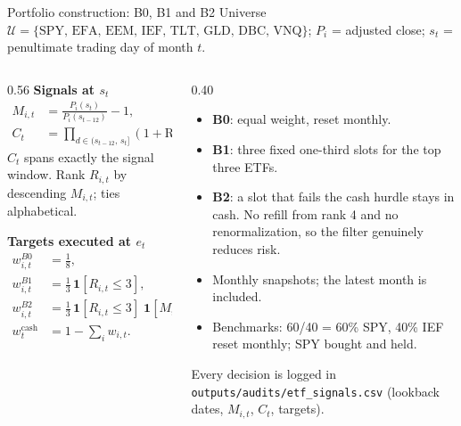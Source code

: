 \documentclass[aspectratio=169,11pt]{beamer}
\begin{document}
\begin{frame}[t]{Portfolio construction: B0, B1 and B2}
\small
Universe $\mathcal{U}=\{\text{SPY, EFA, EEM, IEF, TLT, GLD, DBC, VNQ}\}$; $P_i$ = adjusted close; $s_t$ = penultimate trading day of month $t$.
\vskip0.1cm
\begin{columns}[T,onlytextwidth]
\begin{column}{0.56\textwidth}
\textbf{Signals at $s_t$}
\begin{align*}
M_{i,t} &= \frac{P_i(s_t)}{P_i(s_{t-12})}-1, \\
C_t &= \prod_{d\in(s_{t-12},\,s_t]}(1+\mathrm{RF}_d)-1 .
\end{align*}
$C_t$ spans exactly the signal window. Rank $R_{i,t}$ by descending $M_{i,t}$; ties alphabetical.

\vskip0.15cm
\textbf{Targets executed at $e_t$}
\begin{align*}
w^{B0}_{i,t} &= \tfrac18, \\
w^{B1}_{i,t} &= \tfrac13\,\mathbf{1}[R_{i,t}\le 3], \\
w^{B2}_{i,t} &= \tfrac13\,\mathbf{1}[R_{i,t}\le 3]\;\mathbf{1}[M_{i,t}>C_t], \\
w^{\text{cash}}_{t} &= 1-\textstyle\sum_i w_{i,t}.
\end{align*}
\end{column}
\begin{column}{0.40\textwidth}
\footnotesize
\begin{itemize}\itemsep3pt
\item \textbf{B0}: equal weight, reset monthly.
\item \textbf{B1}: three fixed one-third slots for the top three ETFs.
\item \textbf{B2}: a slot that fails the cash hurdle stays in cash. No refill from rank 4 and no renormalization, so the filter genuinely reduces risk.
\item Monthly snapshots; the latest month is included.
\item Benchmarks: 60/40 = 60\% SPY, 40\% IEF reset monthly; SPY bought and held.
\end{itemize}
\vskip0.1cm
{\scriptsize\color{muted}Every decision is logged in \texttt{outputs/audits/etf\_signals.csv} (lookback dates, $M_{i,t}$, $C_t$, targets).}
\end{column}
\end{columns}
\end{frame}
\end{document}
